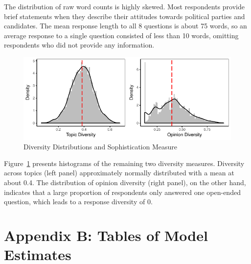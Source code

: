 \documentclass[12pt]{article}
\begin{document}
The distribution of raw word counts is highly skewed. Most respondents provide brief statements when they describe their attitudes towards political parties and candidates. The mean response length to all 8 questions is about 75 words, so an average response to a single question consisted of less than 10 words, omitting respondents who did not provide any information. 

\begin{figure}[h]\centering
\includegraphics{../fig/diversity.pdf}
\caption{Diversity Distributions and Sophistication Measure}\label{fig:diversity}
\end{figure}

Figure~\ref{fig:diversity} presents histograms of the remaining two diversity measures. Diversity across topics (left panel) approximately normally distributed with a mean at about 0.4. The distribution of opinion diversity (right panel), on the other hand, indicates that a large proportion of respondents only answered one open-ended question, which leads to a response diversity of 0.


\clearpage
\section*{Appendix B: Tables of Model Estimates}
\renewcommand\thefigure{B.\arabic{figure}}
\renewcommand\thetable{B.\arabic{table}}
\setcounter{figure}{0}
\setcounter{table}{0}







\end{document}
